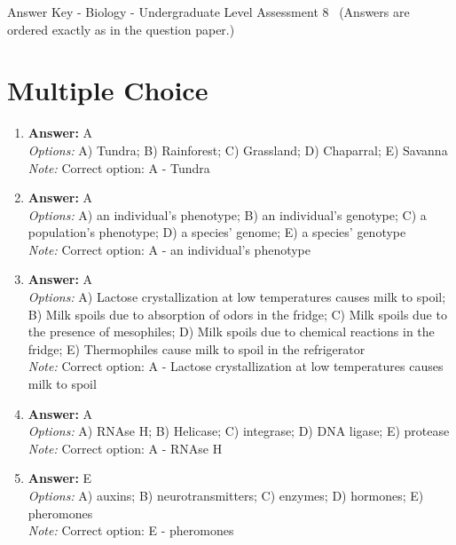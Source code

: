 \documentclass[12pt]{article}
\begin{document}
\begin{center}
Answer Key - Biology - Undergraduate Level Assessment 8 \
\small (Answers are ordered exactly as in the question paper.)
\end{center}

\section*{Multiple Choice}
\begin{enumerate}[label=\arabic*.]
\item \textbf{Answer:} A
\\ \textit{Options:} A) Tundra; B) Rainforest; C) Grassland; D) Chaparral; E) Savanna
\\ \textit{Note:} Correct option: A - Tundra
\item \textbf{Answer:} A
\\ \textit{Options:} A) an individual's phenotype; B) an individual's genotype; C) a population's phenotype; D) a species' genome; E) a species' genotype
\\ \textit{Note:} Correct option: A - an individual's phenotype
\item \textbf{Answer:} A
\\ \textit{Options:} A) Lactose crystallization at low temperatures causes milk to spoil; B) Milk spoils due to absorption of odors in the fridge; C) Milk spoils due to the presence of mesophiles; D) Milk spoils due to chemical reactions in the fridge; E) Thermophiles cause milk to spoil in the refrigerator
\\ \textit{Note:} Correct option: A - Lactose crystallization at low temperatures causes milk to spoil
\item \textbf{Answer:} A
\\ \textit{Options:} A) RNAse H; B) Helicase; C) integrase; D) DNA ligase; E) protease
\\ \textit{Note:} Correct option: A - RNAse H
\item \textbf{Answer:} E
\\ \textit{Options:} A) auxins; B) neurotransmitters; C) enzymes; D) hormones; E) pheromones
\\ \textit{Note:} Correct option: E - pheromones
\end{enumerate}
\end{document}
